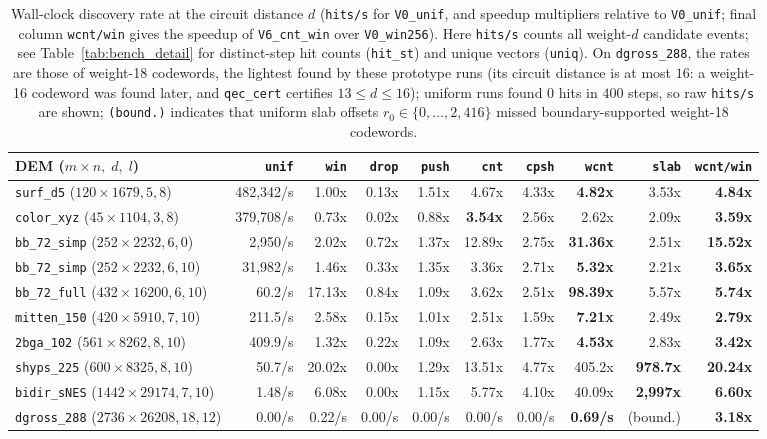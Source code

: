 \documentclass[12pt]{article}
\theoremstyle{definition}
\newcommand{\ttt}[1]{\texttt{#1}}
\begin{document}
\begin{table}[htbp]
\centering
\caption{Wall-clock discovery rate at the circuit distance $d$ (\ttt{hits/s} for \ttt{V0\_unif}, and speedup
multipliers relative to \ttt{V0\_unif}; final column \ttt{wcnt/win} gives the speedup of \ttt{V6\_cnt\_win} over
\ttt{V0\_win256}). Here \ttt{hits/s} counts all weight-$d$ candidate events; see Table~\ref{tab:bench_detail} for
distinct-step hit counts (\ttt{hit\_st}) and unique vectors (\ttt{uniq}). On \ttt{dgross\_288}, the rates are those of
weight-18 codewords, the lightest found by these prototype runs (its circuit distance is at most $16$: a weight-16
codeword was found later, and \ttt{qec\_cert} certifies $13 \le d \le 16$); uniform
runs found $0$ hits in $400$ steps, so raw \ttt{hits/s} are shown; \ttt{(bound.)} indicates that uniform slab
offsets $r_0 \in \{0, \dots, 2{,}416\}$ missed boundary-supported weight-18 codewords.}\label{tab:bench_summary}
\smallskip
\scriptsize
\setlength{\tabcolsep}{3.3pt}
\begin{tabular}{@{}lrrrrrrrrr@{}}
\toprule
DEM ($m \times n,\; d,\; l$) & \ttt{unif} & \ttt{win} & \ttt{drop} & \ttt{push} & \ttt{cnt} & \ttt{cpsh} &
  \ttt{wcnt} & \ttt{slab} & \ttt{wcnt/win} \\
\midrule
\ttt{surf\_d5} ($120{\times}1679, 5, 8$) & 482,342/s & 1.00x & 0.13x & 1.51x & 4.67x & 4.33x & \textbf{4.82x} &
  3.53x & \textbf{4.84x} \\
\ttt{color\_xyz} ($45{\times}1104, 3, 8$) & 379,708/s & 0.73x & 0.02x & 0.88x & \textbf{3.54x} & 2.56x & 2.62x &
  2.09x & \textbf{3.59x} \\
\ttt{bb\_72\_simp} ($252{\times}2232, 6, 0$) & 2,950/s & 2.02x & 0.72x & 1.37x & 12.89x & 2.75x & \textbf{31.36x}
  & 2.51x & \textbf{15.52x} \\
\ttt{bb\_72\_simp} ($252{\times}2232, 6, 10$) & 31,982/s & 1.46x & 0.33x & 1.35x & 3.36x & 2.71x & \textbf{5.32x}
  & 2.21x & \textbf{3.65x} \\
\ttt{bb\_72\_full} ($432{\times}16200, 6, 10$) & 60.2/s & 17.13x & 0.84x & 1.09x & 3.62x & 2.51x & \textbf{98.39x}
  & 5.57x & \textbf{5.74x} \\
\ttt{mitten\_150} ($420{\times}5910, 7, 10$) & 211.5/s & 2.58x & 0.15x & 1.01x & 2.51x & 1.59x & \textbf{7.21x} &
  2.49x & \textbf{2.79x} \\
\ttt{2bga\_102} ($561{\times}8262, 8, 10$) & 409.9/s & 1.32x & 0.22x & 1.09x & 2.63x & 1.77x & \textbf{4.53x} &
  2.83x & \textbf{3.42x} \\
\ttt{shyps\_225} ($600{\times}8325, 8, 10$) & 50.7/s & 20.02x & 0.00x & 1.29x & 13.51x & 4.77x & 405.2x &
  \textbf{978.7x} & \textbf{20.24x} \\
\ttt{bidir\_sNES} ($1442{\times}29174, 7, 10$) & 1.48/s & 6.08x & 0.00x & 1.15x & 5.77x & 4.10x & 40.09x &
  \textbf{2,997x} & \textbf{6.60x} \\
\ttt{dgross\_288} ($2736{\times}26208, 18, 12$) & 0.00/s & 0.22/s & 0.00/s & 0.00/s & 0.00/s & 0.00/s &
  \textbf{0.69/s} & (bound.) & \textbf{3.18x} \\
\bottomrule
\end{tabular}
\end{table}
\end{document}
